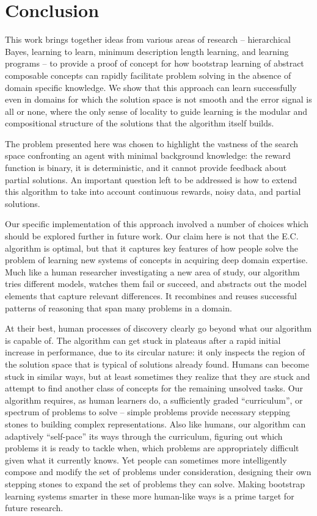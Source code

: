 \documentclass{article}
\begin{document}
\section{Conclusion}
This work brings together ideas from various areas of research --
hierarchical Bayes, learning to learn, minimum description length
learning, and learning programs -- to provide a proof of concept for
how bootstrap learning of abstract composable concepts can rapidly
facilitate problem solving in the absence of domain specific
knowledge. We show that this approach can learn successfully even in
domains for which the solution space is not smooth and the error
signal is all or none, where the only sense of locality to guide
learning is the modular and compositional structure of the solutions
that the algorithm itself builds.

The problem presented here was chosen to highlight the vastness of the
search space confronting an agent with minimal background knowledge:
the reward function is binary, it is deterministic, and it cannot
provide feedback about partial solutions. An important question left
to be addressed is how to extend this algorithm to take into account
continuous rewards, noisy data, and partial solutions.

Our specific implementation of this approach involved a number of
choices which should be explored further in future work.  Our claim
here is not that the E.C. algorithm is optimal, but that it captures key
features of how people solve the problem of learning new systems of
concepts in acquiring deep domain expertise.  Much like a human
researcher investigating a new area of study, our algorithm tries
different models, watches them fail or succeed, and abstracts out the
model elements that capture relevant differences.  It recombines and
reuses successful patterns of reasoning that span many problems in a
domain.

At their best, human processes of discovery clearly go beyond
what our algorithm is capable of.  The algorithm can get stuck in
plateaus after a rapid initial increase in performance, due to its
circular nature: it only inspects the region of the solution space
that is typical of solutions already found.  Humans can become stuck
in similar ways, but at least sometimes they realize that they are
stuck and attempt to find another class of concepts for the remaining
unsolved tasks.  Our algorithm requires, as human learners do, a
sufficiently graded ``curriculum'', or spectrum of problems to solve --
simple problems provide necessary stepping stones to building complex
representations.  Also like humans, our algorithm can adaptively
``self-pace'' its ways through the curriculum, figuring out which
problems it is ready to tackle when, which problems are appropriately
difficult given what it currently knows.  Yet people can sometimes
more intelligently compose and modify the set of problems under
consideration, designing their own stepping stones to expand the set
of problems they can solve.  Making bootstrap learning systems smarter
in these more human-like ways is a prime target for future research.




\end{document}
